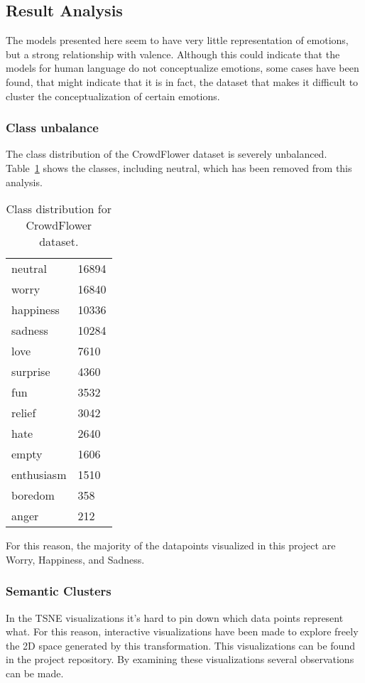 \subsection{Result Analysis}\label{sub:Result Analysis}
The models presented here seem to have very little representation of emotions, but a strong relationship with valence. Although this could indicate that the models for human language do not conceptualize emotions, some cases have been found, that might indicate that it is in fact, the dataset that makes it difficult to cluster the conceptualization of certain emotions.

\subsubsection{Class unbalance}
The class distribution of the CrowdFlower dataset is severely unbalanced. Table~\ref{tab:CrowdFlower_distribution} shows the classes, including neutral, which has been removed from this analysis.

\begin{table}
    \centering
    \begin{tabular}{|l|l|}
    \hline
      neutral     &  16894 \\
      worry       &  16840 \\
      happiness   &  10336 \\
      sadness     &  10284 \\
      love        &   7610 \\
      surprise    &   4360 \\
      fun         &   3532 \\
      relief      &   3042 \\
      hate        &   2640 \\
      empty       &   1606 \\
      enthusiasm  &   1510 \\
      boredom     &    358 \\
      anger       &    212 \\
    \end{tabular}
    \caption{Class distribution for CrowdFlower dataset.}\label{tab:CrowdFlower_distribution}
\end{table}

For this reason, the majority of the datapoints visualized in this project are Worry, Happiness, and Sadness.

\subsubsection{Semantic Clusters}
In the TSNE visualizations it's hard to pin down which data points represent what. For this reason, interactive visualizations have been made to explore freely the 2D space generated by this transformation. This visualizations can be found in the project repository. By examining these visualizations several observations can be made.

